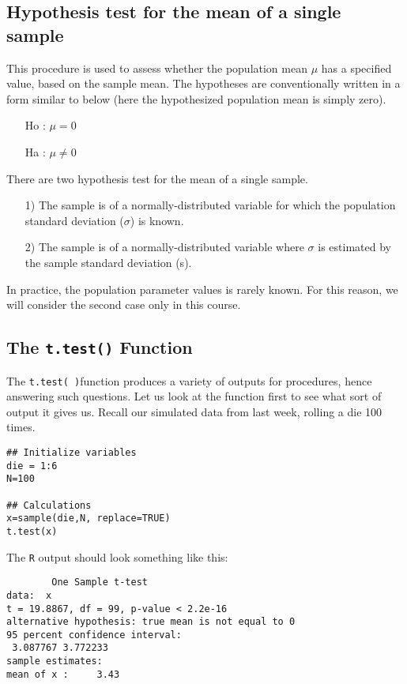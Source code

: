 \documentclass[a4paper,12pt]{article}
\begin{document}
\subsection{Hypothesis test for the mean of a single sample }

This procedure is used to assess whether the population mean $\mu$  has a specified value, based on the sample mean. The hypotheses are conventionally written in a form similar to below (here the hypothesized population mean is simply zero).

       \begin{itemize}
       \item[Ho] : $\mu = 0$
       \item[Ha] : $\mu \neq 0$
       \end{itemize}

There are two hypothesis test for the mean of a single sample.

\begin{itemize}
 \item [1)] The sample is of a normally-distributed variable for which the population standard deviation ($\sigma$) is known.
 \item [2)] The sample is of a normally-distributed variable where $\sigma$ is estimated by the sample standard deviation (s).
\end{itemize}
In practice, the population parameter values is rarely known. For this reason, we will consider the second case only in this course.

\subsection{The \texttt{t.test()} Function}
The \texttt{t.test( )}function produces a variety of  outputs for procedures, hence answering such questions. Let us look at the function first to see what sort of output it gives us.
Recall our simulated data from last week, rolling a die 100 times.

\begin{framed}
\begin{verbatim}
## Initialize variables
die = 1:6
N=100

## Calculations
x=sample(die,N, replace=TRUE)
t.test(x)
\end{verbatim}
\end{framed}
The \texttt{R} output should look something like this:
\begin{verbatim}
        One Sample t-test
data:  x
t = 19.8867, df = 99, p-value < 2.2e-16
alternative hypothesis: true mean is not equal to 0
95 percent confidence interval:
 3.087767 3.772233
sample estimates:
mean of x :     3.43
\end{verbatim}
\end{document}
